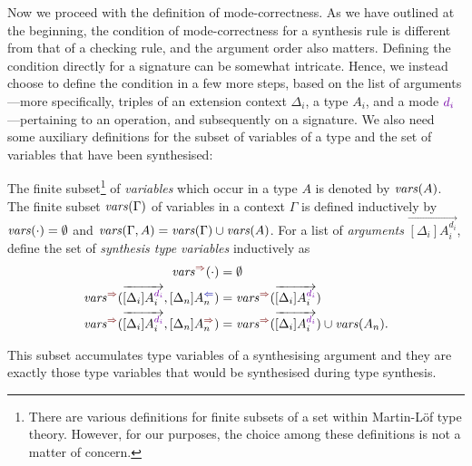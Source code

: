 Now we proceed with the definition of mode-correctness.
As we have outlined at the beginning, the condition of mode-correctness for a synthesis rule is different from that of a checking rule, and the argument order also matters.
Defining the condition directly for a signature can be somewhat intricate.
Hence, we instead choose to define the condition in a few more steps, based on the list of arguments---more specifically, triples of an extension context $\Delta_i$, a type $A_i$, and a mode $\dir{d_i}$---pertaining to an operation, and subsequently on a signature.
We also need some auxiliary definitions for the subset of variables of a type and the set of variables that have been synthesised:
\begin{definition}
  The finite subset\footnote{%
  There are various definitions for finite subsets of a set within Martin-L\"{o}f type theory.
  However, for our purposes, the choice among these definitions is not a matter of concern.}
  of \emph{variables} which occur in a type $A$ is denoted by $\mathit{vars}(A)$.
  The finite subset $\mathit{vars}(\Gamma)$ of variables in a context $\Gamma$ is defined inductively by $\mathit{vars}(\cdot) = \emptyset$ and $\mathit{vars}(\Gamma, A) = \mathit{vars}(\Gamma) \cup \mathit{vars}(A)$.
  For a list of \emph{arguments} $\overrightarrow{[\Delta_i]A_i^{d_i}}$, define the set of \emph{synthesis type variables} inductively as 
  \begin{align*}
    \synvar(\cdot)                                  & = \emptyset  \\
    \synvar(\overrightarrow{[\Delta_i]A_i^{\dir{d_i}}}, [\Delta_{n}] A_{n}^{\dir{\chk}}) & = 
    \synvar(\overrightarrow{[\Delta_i]A_i^{\dir{d_i}}}) \\
    \synvar(\overrightarrow{[\Delta_i]A_i^{\dir{d_i}}}, [\Delta_{n}] A_{n}^{\dir{\syn}}) & = 
    \synvar(\overrightarrow{[\Delta_i]A_i^{\dir{d_i}}}) \cup \fv(A_{n}).
  \end{align*}
\end{definition}
This subset accumulates type variables of a synthesising argument and they are exactly those type variables that would be synthesised during type synthesis.


